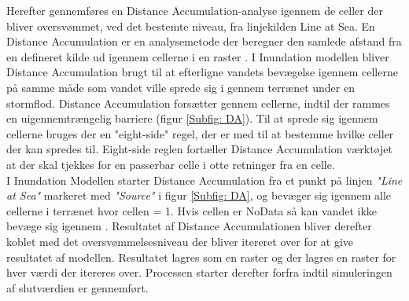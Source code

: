 Herefter gennemføres en Distance Accumulation-analyse igennem de celler der bliver oversvømmet, ved det bestemte niveau, fra linjekilden Line at Sea. En Distance Accumulation er en analysemetode der beregner den samlede afstand fra en defineret kilde ud igennem cellerne i en raster \citep{esri_how_nodate}. I Inundation modellen bliver Distance Accumulation brugt til at efterligne vandets bevægelse igennem cellerne på samme måde som vandet ville sprede sig i gennem terrænet under en stormflod. Distance Accumulation forsætter gennem cellerne, indtil der rammes en uigennemtrængelig barriere (figur \ref{Subfig: DA}). Til at sprede sig igennem cellerne bruges der en "eight-side" \hspace{0.2cm}regel, der er med til at bestemme hvilke celler der kan spredes til. Eight-side reglen fortæller Distance Accumulation værktøjet at der skal tjekkes for en passerbar celle i otte retninger fra en celle.\\

I Inundation Modellen starter Distance Accumulation fra et punkt på linjen \textit{"Line at Sea"} markeret med \textit{"Source"} i figur \ref{Subfig: DA}, og bevæger sig igennem alle cellerne i terrænet hvor cellen = 1. Hvis cellen er NoData så kan vandet ikke bevæge sig igennem \citep{balstrom_kirby_inundation}. Resultatet af Distance Accumulationen bliver derefter koblet med det oversvømmelsesniveau der bliver itereret over for at give resultatet af modellen. Resultatet lagres som en raster og der lagres en raster for hver værdi der itereres over. Processen starter derefter forfra indtil simuleringen af slutværdien er gennemført.  